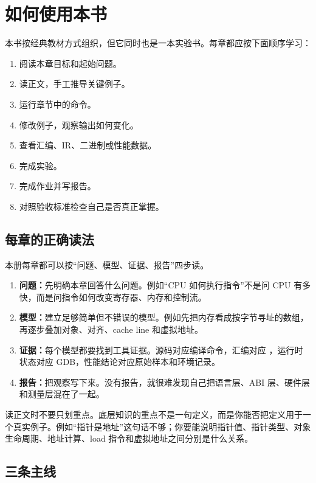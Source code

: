 \chapter*{如何使用本书}

本书按经典教材方式组织，但它同时也是一本实验书。每章都应按下面顺序学习：

\begin{enumerate}
  \item 阅读本章目标和起始问题。
  \item 读正文，手工推导关键例子。
  \item 运行章节中的命令。
  \item 修改例子，观察输出如何变化。
  \item 查看汇编、IR、二进制或性能数据。
  \item 完成实验。
  \item 完成作业并写报告。
  \item 对照验收标准检查自己是否真正掌握。
\end{enumerate}

\section*{每章的正确读法}

本册每章都可以按“问题、模型、证据、报告”四步读。

\begin{enumerate}
  \item \textbf{问题：}先明确本章回答什么问题。例如“CPU 如何执行指令”不是问 CPU 有多快，而是问指令如何改变寄存器、内存和控制流。
  \item \textbf{模型：}建立足够简单但不错误的模型。例如先把内存看成按字节寻址的数组，再逐步叠加对象、对齐、cache line 和虚拟地址。
  \item \textbf{证据：}每个模型都要找到工具证据。源码对应编译命令，汇编对应 ，运行时状态对应 GDB，性能结论对应原始样本和环境记录。
  \item \textbf{报告：}把观察写下来。没有报告，就很难发现自己把语言层、ABI 层、硬件层和测量层混在了一起。
\end{enumerate}

读正文时不要只划重点。底层知识的重点不是一句定义，而是你能否把定义用于一个真实例子。例如“指针是地址”这句话不够；你要能说明指针值、指针类型、对象生命周期、地址计算、load 指令和虚拟地址之间分别是什么关系。

\section*{三条主线}

